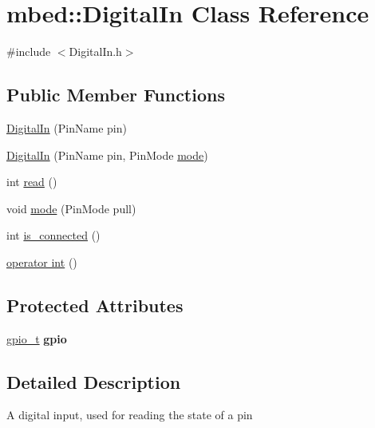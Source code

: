 \hypertarget{classmbed_1_1DigitalIn}{}\section{mbed\+:\+:Digital\+In Class Reference}
\label{classmbed_1_1DigitalIn}


{\ttfamily \#include $<$Digital\+In.\+h$>$}

\subsection*{Public Member Functions}
\begin{DoxyCompactItemize}
\item 
\hyperlink{classmbed_1_1DigitalIn_a6593a15bcecfd3666c49bba83c81ee9b}{Digital\+In} (Pin\+Name pin)
\item 
\hyperlink{classmbed_1_1DigitalIn_a4f07c90ffec20a9724ef42a61f7d21eb}{Digital\+In} (Pin\+Name pin, Pin\+Mode \hyperlink{classmbed_1_1DigitalIn_a9f3e23f670999a3f0ecb5ad959d1667a}{mode})
\item 
int \hyperlink{classmbed_1_1DigitalIn_aa19e2bc687842e7a1414ec5599f4f0e9}{read} ()
\item 
void \hyperlink{classmbed_1_1DigitalIn_a9f3e23f670999a3f0ecb5ad959d1667a}{mode} (Pin\+Mode pull)
\item 
int \hyperlink{classmbed_1_1DigitalIn_a0d765cc5944adfd9544cfb881d3d25e2}{is\+\_\+connected} ()
\item 
\hyperlink{classmbed_1_1DigitalIn_add1742ff230f5a6ba35f26056d11b4f6}{operator int} ()
\end{DoxyCompactItemize}
\subsection*{Protected Attributes}
\begin{DoxyCompactItemize}
\item 
\hyperlink{structgpio__t}{gpio\+\_\+t} {\bfseries gpio}\hypertarget{classmbed_1_1DigitalIn_a6cbb51f8b90fc874a7f720f8e5c70e9e}{}\label{classmbed_1_1DigitalIn_a6cbb51f8b90fc874a7f720f8e5c70e9e}

\end{DoxyCompactItemize}


\subsection{Detailed Description}
A digital input, used for reading the state of a pin

